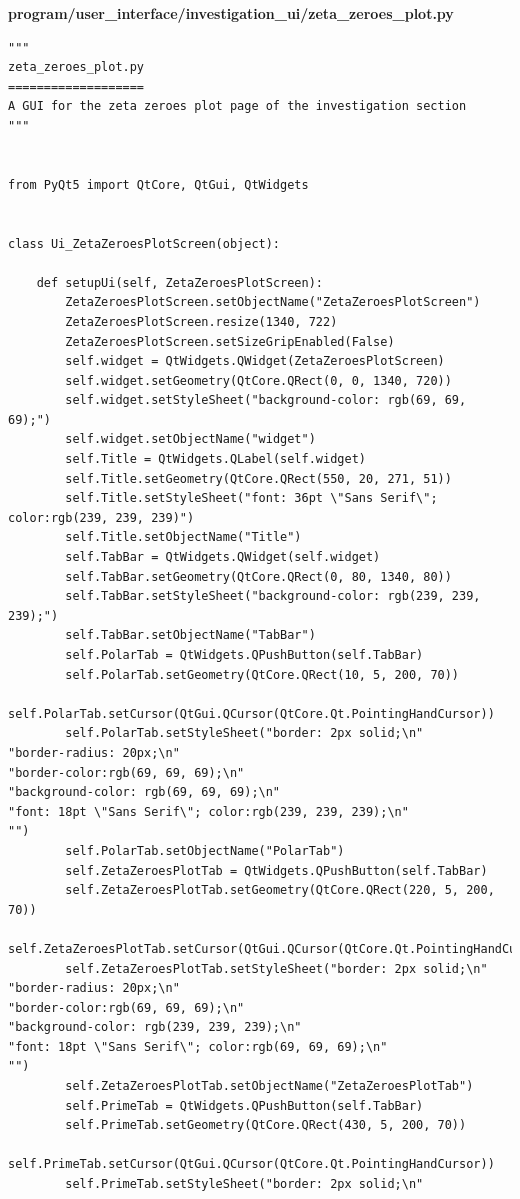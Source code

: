 \documentclass{article}
\begin{document}
\textbf{program/user\_interface/investigation\_ui/zeta\_zeroes\_plot.py}
\begin{lstlisting}
"""
zeta_zeroes_plot.py
===================
A GUI for the zeta zeroes plot page of the investigation section
"""


from PyQt5 import QtCore, QtGui, QtWidgets


class Ui_ZetaZeroesPlotScreen(object):

    def setupUi(self, ZetaZeroesPlotScreen):
        ZetaZeroesPlotScreen.setObjectName("ZetaZeroesPlotScreen")
        ZetaZeroesPlotScreen.resize(1340, 722)
        ZetaZeroesPlotScreen.setSizeGripEnabled(False)
        self.widget = QtWidgets.QWidget(ZetaZeroesPlotScreen)
        self.widget.setGeometry(QtCore.QRect(0, 0, 1340, 720))
        self.widget.setStyleSheet("background-color: rgb(69, 69, 69);")
        self.widget.setObjectName("widget")
        self.Title = QtWidgets.QLabel(self.widget)
        self.Title.setGeometry(QtCore.QRect(550, 20, 271, 51))
        self.Title.setStyleSheet("font: 36pt \"Sans Serif\"; color:rgb(239, 239, 239)")
        self.Title.setObjectName("Title")
        self.TabBar = QtWidgets.QWidget(self.widget)
        self.TabBar.setGeometry(QtCore.QRect(0, 80, 1340, 80))
        self.TabBar.setStyleSheet("background-color: rgb(239, 239, 239);")
        self.TabBar.setObjectName("TabBar")
        self.PolarTab = QtWidgets.QPushButton(self.TabBar)
        self.PolarTab.setGeometry(QtCore.QRect(10, 5, 200, 70))
        self.PolarTab.setCursor(QtGui.QCursor(QtCore.Qt.PointingHandCursor))
        self.PolarTab.setStyleSheet("border: 2px solid;\n"
"border-radius: 20px;\n"
"border-color:rgb(69, 69, 69);\n"
"background-color: rgb(69, 69, 69);\n"
"font: 18pt \"Sans Serif\"; color:rgb(239, 239, 239);\n"
"")
        self.PolarTab.setObjectName("PolarTab")
        self.ZetaZeroesPlotTab = QtWidgets.QPushButton(self.TabBar)
        self.ZetaZeroesPlotTab.setGeometry(QtCore.QRect(220, 5, 200, 70))
        self.ZetaZeroesPlotTab.setCursor(QtGui.QCursor(QtCore.Qt.PointingHandCursor))
        self.ZetaZeroesPlotTab.setStyleSheet("border: 2px solid;\n"
"border-radius: 20px;\n"
"border-color:rgb(69, 69, 69);\n"
"background-color: rgb(239, 239, 239);\n"
"font: 18pt \"Sans Serif\"; color:rgb(69, 69, 69);\n"
"")
        self.ZetaZeroesPlotTab.setObjectName("ZetaZeroesPlotTab")
        self.PrimeTab = QtWidgets.QPushButton(self.TabBar)
        self.PrimeTab.setGeometry(QtCore.QRect(430, 5, 200, 70))
        self.PrimeTab.setCursor(QtGui.QCursor(QtCore.Qt.PointingHandCursor))
        self.PrimeTab.setStyleSheet("border: 2px solid;\n"

\end{lstlisting}
\end{document}
